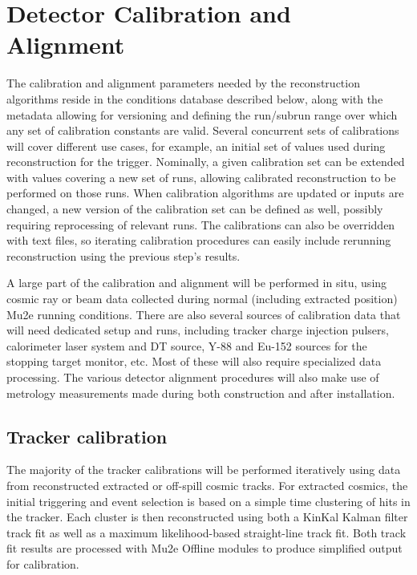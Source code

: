\section{Detector Calibration and Alignment}
\label{sec:calibration}

The calibration and alignment parameters needed by the reconstruction algorithms reside in the conditions database described below, along with the metadata allowing for versioning and defining the run/subrun range over which any set of calibration constants are valid. Several concurrent sets of calibrations will cover different use cases, for example, an initial set of values used during reconstruction for the trigger. Nominally, a given calibration set can be extended with values covering a new set of runs, allowing calibrated reconstruction to be performed on those runs. When calibration algorithms are updated or inputs are changed, a new version of the calibration set can be defined as well, possibly requiring reprocessing of relevant runs. The calibrations can also be overridden with text files, so iterating calibration procedures can easily include rerunning reconstruction using the previous step's results.

A large part of the calibration and alignment will be performed in situ, using cosmic ray or beam data collected during normal (including extracted position) Mu2e running conditions. There are also several sources of calibration data that will need dedicated setup and runs, including tracker charge injection pulsers, calorimeter laser system and DT source, Y-88 and Eu-152 sources for the stopping target monitor, etc. Most of these will also require specialized data processing. The various detector alignment procedures will also make use of metrology measurements made during both construction and after installation.

\subsection{Tracker calibration}

The majority of the tracker calibrations will be performed iteratively using data from reconstructed extracted or off-spill cosmic tracks. For extracted cosmics, the initial triggering and event selection is based on a simple time clustering of hits in the tracker. Each cluster is then reconstructed using both a KinKal Kalman filter track fit as well as a maximum likelihood-based straight-line track fit. Both track fit results are processed with Mu2e Offline modules to produce simplified output for calibration. 

